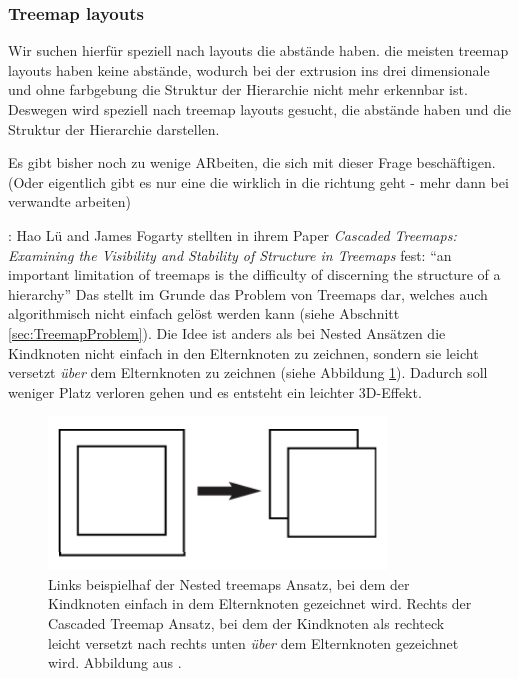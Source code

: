 \subsubsection{Treemap layouts}
Wir suchen hierfür speziell nach layouts die abstände haben. die meisten treemap layouts haben keine abstände, wodurch bei der extrusion ins drei dimensionale und ohne farbgebung die Struktur der Hierarchie nicht mehr erkennbar ist. Deswegen wird speziell nach treemap layouts gesucht, die abstände haben und die Struktur der Hierarchie darstellen.


Es gibt bisher noch zu wenige ARbeiten, die sich mit dieser Frage beschäftigen. (Oder eigentlich gibt es nur eine die wirklich in die richtung geht - mehr dann bei verwandte arbeiten)


\cite{lu2008cascaded}:
Hao Lü and James Fogarty stellten in ihrem Paper \textit{Cascaded Treemaps:
Examining the Visibility and Stability of Structure in Treemaps}\cite{lu2008cascaded} fest: \enquote{an important limitation of treemaps is
the difficulty of discerning the structure of a hierarchy}\cite[1]{lu2008cascaded} Das stellt im Grunde das Problem von Treemaps dar, welches auch algorithmisch nicht einfach gelöst werden kann (siehe Abschnitt \ref{sec:TreemapProblem}). Die Idee ist anders als bei Nested Ansätzen die Kindknoten nicht einfach in den Elternknoten zu zeichnen, sondern sie leicht versetzt \textit{über} dem Elternknoten zu zeichnen (siehe Abbildung \ref{fig:cascaded}). Dadurch soll weniger Platz verloren gehen und es entsteht ein leichter 3D-Effekt.

\begin{figure}
    \centering
    \includegraphics[width=0.8\textwidth]{images/cascaded.png}
    \caption{Links beispielhaf der Nested treemaps Ansatz, bei dem der Kindknoten einfach in dem Elternknoten gezeichnet wird. Rechts der Cascaded Treemap Ansatz, bei dem der Kindknoten als rechteck leicht versetzt nach rechts unten \textit{über} dem Elternknoten gezeichnet wird. Abbildung aus \cite[3]{lu2008cascaded}.}
    \label{fig:cascaded}
\end{figure}

